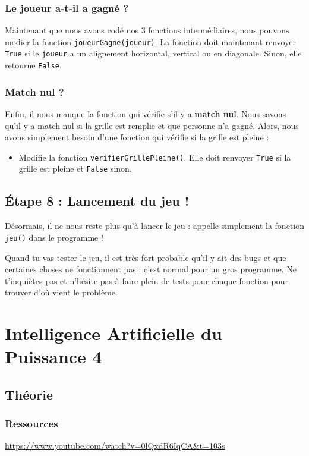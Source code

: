\documentclass[11pt]{article}
\begin{document}
\subsubsection*{Le joueur a-t-il a gagné ?}
\label{sec:orgc19f46e}
Maintenant que nous avons codé nos 3 fonctions intermédiaires, nous pouvons modier la fonction \texttt{joueurGagne(joueur)}. La fonction doit maintenant renvoyer \texttt{True} si le \texttt{joueur} a un alignement horizontal, vertical ou en diagonale. Sinon, elle retourne \texttt{False}.

\subsubsection*{Match nul ?}
\label{sec:org79ab8df}
Enfin, il nous manque la fonction qui vérifie s'il y a \textbf{match nul}. Nous savons qu'il y a match nul si la grille est remplie et que personne n'a gagné. Alors, nous avons simplement besoin d'une fonction qui vérifie si la grille est pleine :
\begin{itemize}
\item Modifie la fonction \texttt{verifierGrillePleine()}. Elle doit renvoyer \texttt{True} si la grille est pleine et \texttt{False} sinon.
\end{itemize}

\subsection*{Étape 8 : Lancement du jeu !}
\label{puissance4_etape8}
Désormais, il ne nous reste plus qu'à lancer le jeu : appelle simplement la fonction \texttt{jeu()} dans le programme !

Quand tu vas tester le jeu, il est très fort probable qu'il y ait des \og bugs\fg{} et que certaines choses ne fonctionnent pas : c'est normal pour un gros programme. Ne t'inquiètes pas et n'hésite pas à faire plein de tests pour chaque fonction pour trouver d'où vient le problème.


\section*{Intelligence Artificielle du Puissance 4}
\label{ia_puissance4}
\subsection*{Théorie}
\label{ia_puissance4_theorie}
\subsubsection*{Ressources}
\label{sec:orgf6f81cc}
\url{https://www.youtube.com/watch?v=0lQxdR6IqCA\&t=103s}
\end{document}

